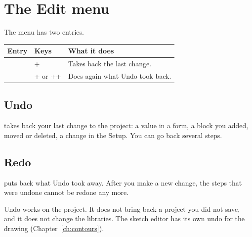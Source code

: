 \chapter{The Edit menu}\label{ch:edit}

The  menu has two entries.

\begin{center}
\begin{tabularx}{\textwidth}{@{}l l Y@{}}
\toprule
\textbf{Entry} & \textbf{Keys} & \textbf{What it does} \\
\midrule
{} & + & Takes back the last change. \\
 & + or ++ & Does again what Undo took back. \\
\bottomrule
\end{tabularx}
\end{center}

\section{Undo}
 takes back your last change to the project: a value in a form, a block you added, moved or deleted, a change in the Setup. You can go back several steps.

\section{Redo}
 puts back what Undo took away. After you make a new change, the steps that were undone cannot be redone any more.

\begin{notebox}
Undo works on the project. It does not bring back a project you did not save, and it does not change the libraries. The sketch editor has its own undo for the drawing (Chapter~\ref{ch:contours}).
\end{notebox}
